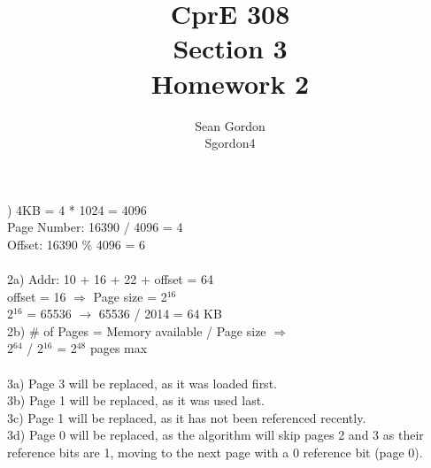 \documentclass[12pt]{article}
\title{CprE 308\\Section 3\\Homework 2}
\author{Sean Gordon\\Sgordon4}
\begin{document}
\maketitle

) 4KB = 4 * 1024 = 4096\\
Page Number: 16390 / 4096 = 4\\
Offset: 16390 \% 4096 = 6\\\\

\noindent 2a) Addr: 10 + 16 + 22 + offset = 64\\
offset = 16 $\Rightarrow$ Page size = 2$^{16}$\\
2$^{16}$ = 65536 $\to$ 65536 / 2014 = 64 KB\\

\noindent 2b) \# of Pages = Memory available / Page size $\Rightarrow$\\
 2$^{64}$ / 2$^{16}$ = 2$^{48}$ pages max\\\\
 
\noindent 3a) Page 3 will be replaced, as it was loaded first.\\
\noindent 3b) Page 1 will be replaced, as it was used last.\\
\noindent 3c) Page 1 will be replaced, as it has not been referenced recently.\\
\noindent 3d) Page 0 will be replaced, as the algorithm will skip pages 2 and 3 as their reference bits are 1, moving to the next page with a 0 reference bit (page 0).\\


\end{document}
